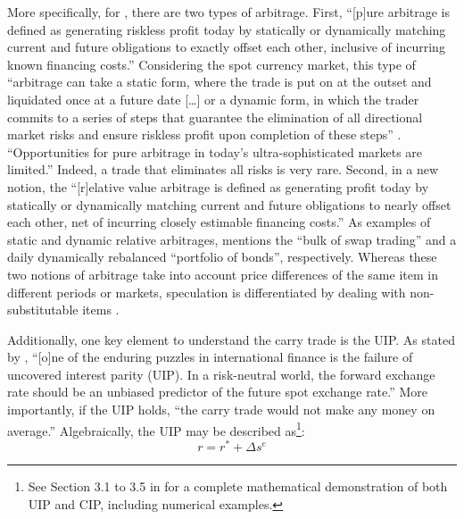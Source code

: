 \documentclass[a4paper, twoside]{templates/ociamthesis}
\begin{document}
More specifically, for \textcite{dubil2011}, there are two types of arbitrage. First, ``{[}p{]}ure arbitrage is defined as generating riskless profit today by statically or dynamically matching current and future obligations to exactly offset each other, inclusive of incurring known financing costs.'' \autocite[ 9]{dubil2011} Considering the spot currency market, this type of ``arbitrage can take a static form, where the trade is put on at the outset and liquidated once at a future date {[}\ldots{]} or a dynamic form, in which the trader commits to a series of steps that guarantee the elimination of all directional market risks and ensure riskless profit upon completion of these steps'' \autocite[ 8]{dubil2011}. ``Opportunities for pure arbitrage in today's ultra-sophisticated markets are limited.'' \autocite[ 9]{dubil2011} Indeed, a trade that eliminates all risks is very rare. Second, in a new notion, the ``{[}r{]}elative value arbitrage is defined as generating profit today by statically or dynamically matching current and future obligations to nearly offset each other, net of incurring closely estimable financing costs.'' \autocite[ 10]{dubil2011} As examples of static and dynamic relative arbitrages, \textcite[ 9]{dubil2011} mentions the ``bulk of swap trading'' and a daily dynamically rebalanced ``portfolio of bonds'', respectively. Whereas these two notions of arbitrage take into account price differences of the same item in different periods or markets, speculation is differentiated by dealing with non-substitutable items \autocite[ 10]{dubil2011}.

Additionally, one key element to understand the carry trade is the UIP. As stated by \textcite[ 1375]{clarida2009}, ``{[}o{]}ne of the enduring puzzles in international finance is the failure of uncovered interest parity (UIP). In a risk-neutral world, the forward exchange rate should be an unbiased predictor of the future spot exchange rate.'' More importantly, if the UIP holds, ``the carry trade would not make any money on average.'' \autocite[ 185]{pedersen2015} Algebraically, the UIP may be described as\footnote{See Section 3.1 to 3.5 in \textcite{copeland2014} for a complete mathematical demonstration of both UIP and CIP, including numerical examples.}:
\begin{equation}
r = r^* + \Delta{s}^e
\label{eq:11}
\end{equation}
\end{document}
